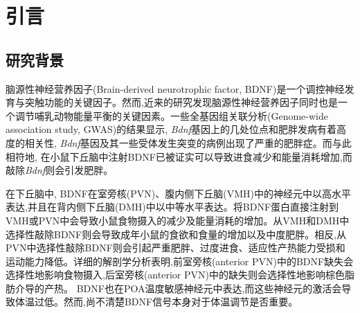 \chapter{引言}\label{chap:introduction}

\section{研究背景}
脑源性神经营养因子(Brain-derived neurotrophic factor, BDNF)是一个调控神经发育与突触功能的关键因子。然而,近来的研究发现脑源性神经营养因子同时也是一个调节哺乳动物能量平衡的关键因素\citep{xu2016neurotrophic}。一些全基因组关联分析(Genome-wide association study, GWAS)的结果显示, \textit{Bdnf}基因上的几处位点和肥胖发病有着高度的相关性\citep{thorleifsson2009genome,speliotes2010association,wen2012meta}, \textit{Bdnf}基因及其一些受体发生突变的病例出现了严重的肥胖症\citep{gray2006hyperphagia}。而与此相符地, 在小鼠下丘脑中注射BDNF已被证实可以导致进食减少和能量消耗增加\citep{wang2007abrain,wang2007bbrain,wang2010brain,godar2011reduction},而敲除\textit{Bdnf}则会引发肥胖\citep{xu2003brain, unger2007selective, liao2012dendritically}。

在下丘脑中, BDNF在室旁核(PVN)、腹内侧下丘脑(VMH)中的神经元中以高水平表达,并且在背内侧下丘脑(DMH)中以中等水平表达\citep{xu2003brain, unger2007selective,liao2012dendritically,an2015discrete}。将BDNF蛋白直接注射到VMH或PVN中会导致小鼠食物摄入的减少及能量消耗的增加\citep{wang2007abrain,wang2007bbrain,godar2011reduction}。从VMH和DMH中选择性敲除BDNF则会导致成年小鼠的食欲和食量的增加以及中度肥胖\citep{unger2007selective}。相反,从PVN中选择性敲除BDNF则会引起严重肥胖、过度进食、适应性产热能力受损和运动能力降低\citep{an2015discrete}。详细的解剖学分析表明,前室旁核(anterior PVN)中的BDNF缺失会选择性地影响食物摄入,后室旁核(anterior PVN)中的缺失则会选择性地影响棕色脂肪介导的产热\citep{an2015discrete}。 BDNF也在POA温度敏感神经元中表达\citep{tan2016warm,zhao2017hypothalamic},而这些神经元的激活会导致体温过低\citep{tan2016warm}。然而,尚不清楚BDNF信号本身对于体温调节是否重要。

